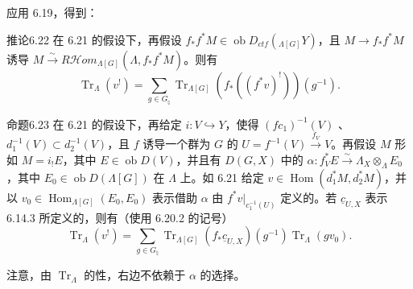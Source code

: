 应用 6.19，得到：
\begin{SGAresult}{推论}{6.22}
在 6.21 的假设下，再假设 $f_*f^*M\in\operatorname{ob}D_{ctf}({}_{\Lambda[G]}Y)$，且 $M\to f_*f^*M$ 诱导 $M\xrightarrow\sim R\mathcal H\!om_{\Lambda[G]}(\Lambda,f_*f^*M)$。则有
\begin{equation}\operatorname{Tr}_\Lambda(v^!)=\sum_{g\in G_\natural}\operatorname{Tr}_{\Lambda[G]}(f_*((f^*v)^!))(g^{-1}).\tag{6.22.1}\end{equation}
\end{SGAresult}

\begin{SGAresult}{命题}{6.23}
在 6.21 的假设下，再给定 $i:V\hookrightarrow Y$，使得 $(fc_1)^{-1}(V)$ 、
$d_1^{-1}(V)\subset d_2^{-1}(V)$，且 $f$ 诱导一个群为 $G$ 的 $U=f^{-1}(V)\xrightarrow{f_V}V$。再假设 $M$ 形如 $M=i_!E$，其中 $E\in\operatorname{ob}D(V)$，并且有 $D(G,X)$ 中的 $\alpha:f_V^*E\xrightarrow\sim\Lambda_X\otimes_\Lambda E_0$，其中 $E_0\in\operatorname{ob}D(\Lambda[G])$ 在 $\Lambda$ 上。如 6.21 给定 $v\in\operatorname{Hom}(d_1^*M,d_2^*M)$，并以 $v_0\in\operatorname{Hom}_{\Lambda[G]}(E_0,E_0)$ 表示借助 $\alpha$ 由 $f^*v|_{c_1^{-1}(U)}$ 定义的。若 $\underline c_{U,X}$ 表示 6.14.3 所定义的，则有（使用 6.20.2 的记号）
\begin{equation}\operatorname{Tr}_\Lambda(v^!)=\sum_{g\in G_\natural}\operatorname{Tr}_{\Lambda[G]}(f_*\underline c_{U,X})(g^{-1})\operatorname{Tr}_\Lambda(gv_0).\tag{6.23.1}\end{equation}
\end{SGAresult}
注意，由 $\operatorname{Tr}_\Lambda$ 的性，右边不依赖于 $\alpha$ 的选择。

